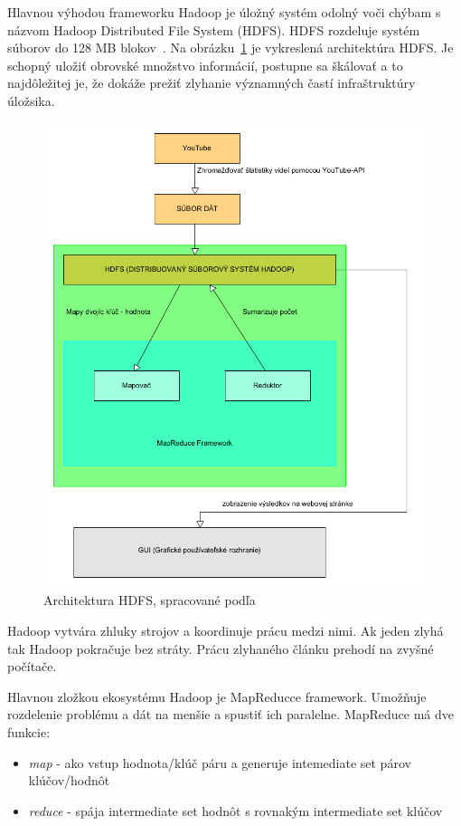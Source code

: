 \documentclass[10pt,slovak,a4paper]{article}
\begin{document}
Hlavnou výhodou frameworku Hadoop je úložný systém odolný voči chýbam s názvom Hadoop Distributed File System (HDFS). HDFS rozdeluje systém súborov do 128 MB blokov~\cite{HDFS}. Na obrázku~\ref{HadoopObrazok} je vykreslená architektúra HDFS. Je schopný uložiť obrovské množstvo informácií, postupne sa škálovať a to najdôležitej je, že dokáže prežiť zlyhanie významných častí infraštruktúry úložsika.
\begin{figure}[H]
  \centering
  \includegraphics[width=1\textwidth]{HDFS_prelozene.png}
  \caption{Architektura HDFS, spracované podľa \cite{HadoopObrazok}}
  \label{HadoopObrazok}
\end{figure}

Hadoop vytvára zhluky strojov a koordinuje prácu medzi nimi. Ak jeden zlyhá tak Hadoop pokračuje bez stráty. Prácu zlyhaného článku prehodí na zvyšné počítače.

Hlavnou zložkou ekosystému Hadoop je MapReducce framework. Umožňuje rozdelenie problému a dát na menšie a spustiť ich paralelne. MapReduce má dve funkcie:

\begin{itemize}
\item \emph {map} - ako vstup hodnota/klúč páru a generuje intemediate set párov klúčov/hodnôt
\item \emph {reduce} - spája intermediate set hodnôt s rovnakým intermediate set klúčov
\end{itemize}
\cite{ZakladneInfo}
\end{document}
